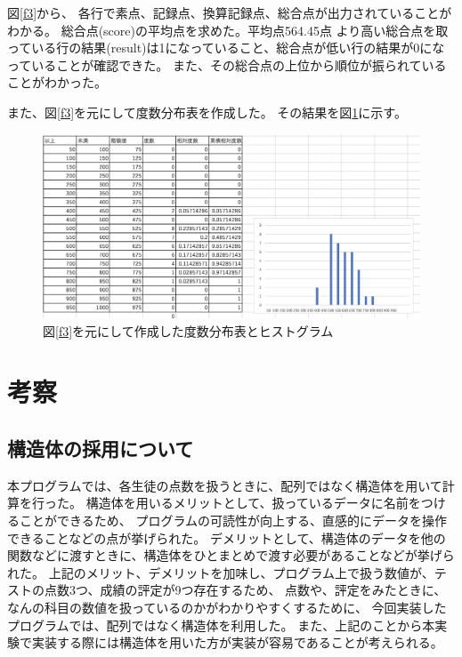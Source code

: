 \documentclass{jsarticle}
\begin{document}
図\ref{f3}から、
各行で素点、記録点、換算記録点、総合点が出力されていることがわかる。
総合点(score)の平均点を求めた。平均点564.45点
より高い総合点を取っている行の結果(result)は1になっていること、総合点が低い行の結果が0になっていることが確認できた。
また、その総合点の上位から順位が振られていることがわかった。

また、図\ref{f3}を元にして度数分布表を作成した。
その結果を図\ref{f4}に示す。

\begin{figure}[H]
  \begin{center}
    \includegraphics[width = 14cm]{f4.png}
    \caption{図\ref{f3}を元にして作成した度数分布表とヒストグラム\label{f4}}
  \end{center}
\end{figure}


\newpage
\section{考察}
\subsection{構造体の採用について}

本プログラムでは、各生徒の点数を扱うときに、配列ではなく構造体を用いて計算を行った。
構造体を用いるメリットとして、扱っているデータに名前をつけることができるため、
プログラムの可読性が向上する、直感的にデータを操作できることなどの点が挙げられた。
デメリットとして、構造体のデータを他の関数などに渡すときに、構造体をひとまとめで渡す必要があることなどが挙げられた。
上記のメリット、デメリットを加味し、プログラム上で扱う数値が、テストの点数3つ、成績の評定が9つ存在するため、
点数や、評定をみたときに、なんの科目の数値を扱っているのかがわかりやすくするために、
今回実装したプログラムでは、配列ではなく構造体を利用した。
また、上記のことから本実験で実装する際には構造体を用いた方が実装が容易であることが考えられる。
\end{document}
